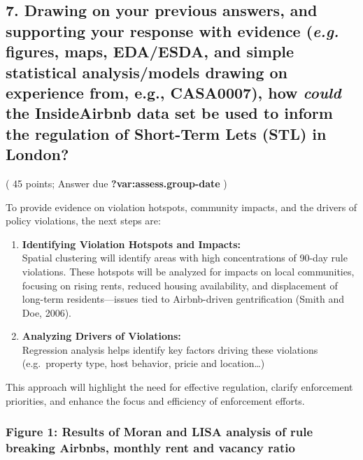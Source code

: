 \documentclass[
  a4paper,
  DIV=11,
  numbers=noendperiod]{scrartcl}
\begin{document}
\subsection{\texorpdfstring{7. Drawing on your previous answers, and
supporting your response with evidence (\emph{e.g.} figures, maps,
EDA/ESDA, and simple statistical analysis/models drawing on experience
from, e.g., CASA0007), how \emph{could} the InsideAirbnb data set be
used to inform the regulation of Short-Term Lets (STL) in
London?}{7. Drawing on your previous answers, and supporting your response with evidence (e.g. figures, maps, EDA/ESDA, and simple statistical analysis/models drawing on experience from, e.g., CASA0007), how could the InsideAirbnb data set be used to inform the regulation of Short-Term Lets (STL) in London?}}\label{drawing-on-your-previous-answers-and-supporting-your-response-with-evidence-e.g.-figures-maps-edaesda-and-simple-statistical-analysismodels-drawing-on-experience-from-e.g.-casa0007-how-could-the-insideairbnb-data-set-be-used-to-inform-the-regulation-of-short-term-lets-stl-in-london}

( 45 points; Answer due \textbf{?var:assess.group-date} )

To provide evidence on violation hotspots, community impacts, and the
drivers of policy violations, the next steps are:

\begin{enumerate}
\def\labelenumi{\arabic{enumi}.}
\item
  \textbf{Identifying Violation Hotspots and Impacts:}\\
  Spatial clustering will identify areas with high concentrations of
  90-day rule violations. These hotspots will be analyzed for impacts on
  local communities, focusing on rising rents, reduced housing
  availability, and displacement of long-term residents---issues tied to
  Airbnb-driven gentrification (Smith and Doe, 2006).
\item
  \textbf{Analyzing Drivers of Violations:}\\
  Regression analysis helps identify key factors driving these
  violations (e.g.~property type, host behavior, pricie and
  location\ldots)
\end{enumerate}

This approach will highlight the need for effective regulation, clarify
enforcement priorities, and enhance the focus and efficiency of
enforcement efforts.

\subsubsection{Figure 1: Results of Moran and LISA analysis of rule
breaking Airbnbs, monthly rent and vacancy
ratio}\label{figure-1-results-of-moran-and-lisa-analysis-of-rule-breaking-airbnbs-monthly-rent-and-vacancy-ratio}
\end{document}
